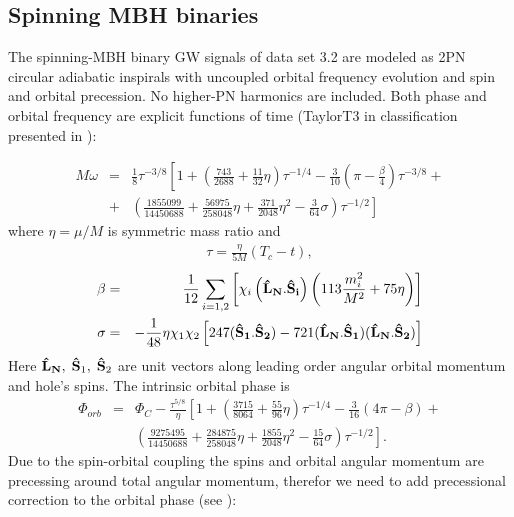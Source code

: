 \documentclass{iopart}
\def\bSo{{\bf \hat{S}_1}}
\def\bSt{{\bf \hat{S}_2}}
\def\bL{{\bf \hat{L}_{N}}}
\begin{document}
\subsection{Spinning MBH binaries}
\label{sec:ch3mbh}

The spinning-MBH binary GW signals of data set 3.2 are modeled as 2PN circular adiabatic inspirals with uncoupled orbital frequency evolution and spin and orbital precession. No higher-PN harmonics are included. Both phase and orbital
frequency are explicit functions of time (TaylorT3 in classification presented in \cite{DIS}):

\begin{eqnarray}
M\omega &=& \frac1{8}\tau^{-3/8} \left[1 + \left(\frac{743}{2688} + \frac{11}{32}\eta\right)\tau^{-1/4} - 
            \frac3{10}\left(\pi - \frac{\beta}{4}\right)\tau^{-3/8} + 
            \right. \nonumber \\ 
            &+& \left.
            \left(\frac{1855099}{14450688} + 
           \frac{56975}{258048}\eta + \frac{371}{2048}\eta^2 - \frac{3}{64}\sigma\right)\tau^{-1/2}\right]
 \end{eqnarray}
where $\eta = \mu/M$ is symmetric mass ratio and 
\begin{eqnarray}
\tau = \frac{\eta}{5M}(T_c - t),
\end{eqnarray}
\begin{eqnarray}
\beta &=& \frac1{12}\sum_{i=1,2} \left[ 
\chi_i \left(\bL.{\bf \hat{S}_i}\right)\left(113\frac{m_i^2}{M^2} + 75\eta\right)
\right] \\
\sigma &=& -\frac1{48}\eta\chi_1\chi_2\left[ 247(\bSo.\bSt) - 721(\bL.\bSo)(\bL.\bSt)
\right]
\end{eqnarray}
Here $\bL, \; {\bf \hat{S}}_1,\;{\bf \hat{S}}_2$ 
are unit vectors along leading order angular orbital momentum and hole's spins.
The intrinsic orbital phase is 
\begin{eqnarray}
\Phi_{orb} &=& \Phi_C - \frac{\tau^{5/8}}{\eta}\left[ 1 + 
  \left(  \frac{3715}{8064} + \frac{55}{96}\eta \right)\tau^{-1/4}
  - \frac{3}{16}(4\pi - \beta) + \right. \nonumber \\
  & & \left. \left( \frac{9275495}{14450688}+ \frac{284875}{258048}\eta+ \frac{1855}{2048}\eta^2 - \frac{15}{64}\sigma  \right) \tau^{-1/2}
\right]. \label{OrbPhN}
\end{eqnarray}
Due to the spin-orbital coupling the spins and orbital angular momentum are precessing around
total angular momentum, therefor we need to add precessional correction to the orbital 
phase (see \cite{ACST}):
\end{document}

